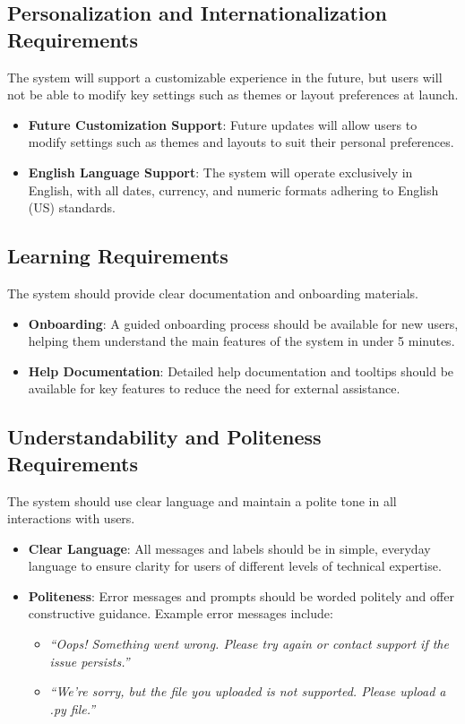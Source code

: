 \documentclass[12pt]{article}
\begin{document}
\subsection{Personalization and Internationalization Requirements}
The system will support a customizable experience in the future, but users will 
not be able to modify key settings such as themes or layout preferences at launch.
\begin{itemize}
    \item \textbf{Future Customization Support}: Future updates will allow users 
    to modify settings such as themes and layouts to suit their personal preferences.
    
    \item \textbf{English Language Support}: The system will operate exclusively 
    in English, with all dates, currency, and numeric formats adhering to 
    English (US) standards.
\end{itemize}

\subsection{Learning Requirements}
The system should provide clear documentation and onboarding materials.
\begin{itemize}
    \item \textbf{Onboarding}: A guided onboarding process should be available 
    for new users, helping them understand the main features of the system 
    in under 5 minutes.
    
    \item \textbf{Help Documentation}: Detailed help documentation and tooltips 
    should be available for key features to reduce the need for external 
    assistance.
\end{itemize}

\subsection{Understandability and Politeness Requirements}
The system should use clear language and maintain a polite tone in all 
interactions with users.
\begin{itemize}
    \item \textbf{Clear Language}: All messages and labels should be in simple, 
    everyday language to ensure clarity for users of different levels of 
    technical expertise.
    
    \item \textbf{Politeness}: Error messages and prompts should be worded 
    politely and offer constructive guidance. Example error messages include:
    \begin{itemize}
        \item \textit{“Oops! Something went wrong. Please try again or contact 
        support if the issue persists.”}
        \item \textit{“We're sorry, but the file you uploaded is not supported. 
        Please upload a .py file.”}
    \end{itemize}
\end{itemize}
\end{document}
